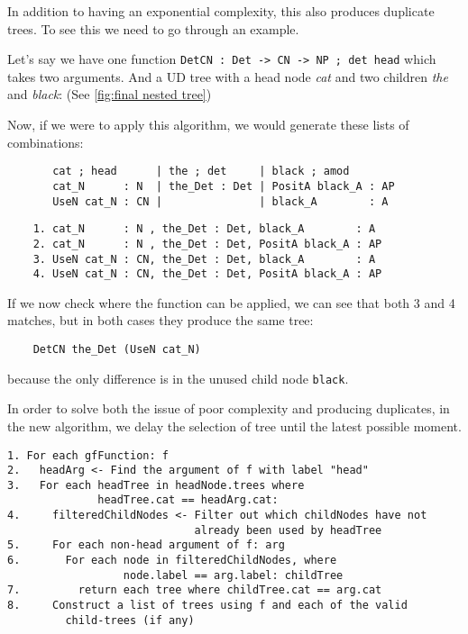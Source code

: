 
In addition to having an exponential complexity, this also produces duplicate trees. To see this we need to go through an example.

Let's say we have one function \verb|DetCN : Det -> CN -> NP ; det head| which takes two arguments.
And a UD tree with a head node \emph{cat} and two children \emph{the} and \emph{black}: (See \autoref{fig:final nested tree})

Now, if we were to apply this algorithm, we would generate these lists of combinations:
\begin{verbatim}
       cat ; head      | the ; det     | black ; amod
       cat_N      : N  | the_Det : Det | PositA black_A : AP
       UseN cat_N : CN |               | black_A        : A
\end{verbatim}

\begin{verbatim}
    1. cat_N      : N , the_Det : Det, black_A        : A
    2. cat_N      : N , the_Det : Det, PositA black_A : AP
    3. UseN cat_N : CN, the_Det : Det, black_A        : A
    4. UseN cat_N : CN, the_Det : Det, PositA black_A : AP
\end{verbatim}

If we now check where the function can be applied, we can see that both 3 and 4 matches,
but in both cases they produce the same tree:
\begin{verbatim}
    DetCN the_Det (UseN cat_N)
\end{verbatim}
because the only difference is in the unused child node \verb|black|.

In order to solve both the issue of poor complexity and producing duplicates, in the new algorithm, we delay the selection of tree until the latest possible moment.




\begin{verbatim}
1. For each gfFunction: f
2.   headArg <- Find the argument of f with label "head"
3.   For each headTree in headNode.trees where
              headTree.cat == headArg.cat:
4.     filteredChildNodes <- Filter out which childNodes have not
                             already been used by headTree
5.     For each non-head argument of f: arg
6.       For each node in filteredChildNodes, where
                  node.label == arg.label: childTree
7.         return each tree where childTree.cat == arg.cat
8.     Construct a list of trees using f and each of the valid
         child-trees (if any)
\end{verbatim}

